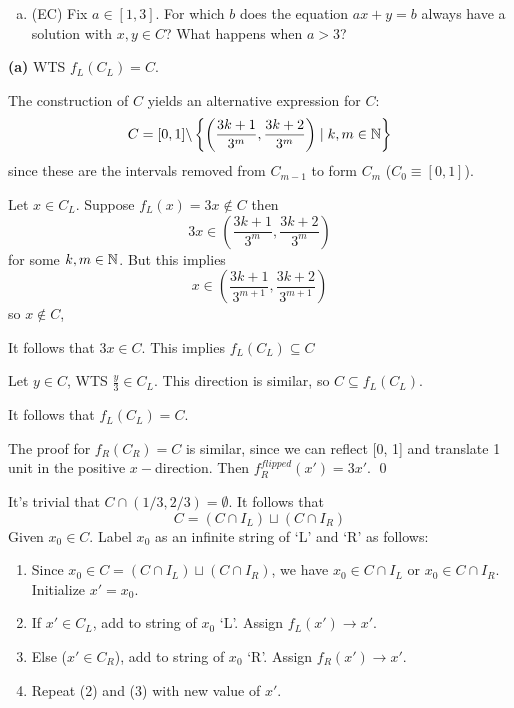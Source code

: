 \documentclass[a4paper, 12pt]{article}
\begin{document}
\begin{problem} [IV]
\begin{enumerate} [(a)]
\begin{center}
          \end{center}
    \item (EC) Fix $a \in [1, 3]$. For which $b$ does the equation $ax + y = b$ always have a solution with $x, y \in C$? What happens when $a > 3$?
\end{enumerate}
\end{problem}
\begin{solution}
    \textbf{(a)} WTS $f_L(C_L) = C$.

    The construction of $C$ yields an alternative expression for $C$:
    \[
        C = [0, 1]\backslash\left\{\left(\frac{3k+1}{3^m}, \frac{3k+2}{3^m}\right) \mid k, m \in \mathbb{N}\right\}
    \]
    since these are the intervals removed from $C_{m-1}$ to form $C_m$ ($C_0 \equiv [0, 1]$).

    Let $x \in C_L$. Suppose $f_L(x) = 3x \not \in C$ then \[
        3x \in \left( \frac{3k+1}{3^m}, \frac{3k+2}{3^m} \right)
    \]
    for some $k, m \in \mathbb{N}$. But this implies \[
        x \in \left( \frac{3k+1}{3^{m+1}}, \frac{3k+2}{3^{m+1}} \right)
    \]
    so $x \not \in C$, \contra

    It follows that $3x \in C$. This implies $f_L(C_L) \subseteq  C$

    Let $y \in C$, WTS $\frac{y}{3} \in C_L$. This direction is similar, so $C \subseteq f_L(C_L)$.

    It follows that $f_L(C_L) = C$.

    The proof for $f_R(C_R) = C$ is similar, since we can reflect [0, 1] and translate 1 unit in the positive $x-$direction. Then $f^{flipped}_R(x') = 3x'$. \qed


    It's trivial that $C \cap (1/3, 2/3) = \emptyset$. It follows that \[
        C  = (C \cap I_L) \sqcup (C \cap I_R)
    \]
    Given $x_0 \in C$. Label $x_0$ as an infinite string of `L' and `R' as follows:


    \begin{enumerate}
        \item Since $x_0 \in C = (C \cap I_L) \sqcup (C \cap I_R)$, we have $x_0 \in C \cap I_L$ or $x_0 \in C \cap I_R$. Initialize $x' = x_0$.
        \item If $x' \in C_L$, add to string of $x_0$ `L'. Assign $f_L(x') \to x'$.
        \item Else ($x' \in C_R$), add to string of $x_0$ `R'. Assign $f_R(x') \to x'$.
        \item Repeat (2) and (3) with new value of $x'$.
    \end{enumerate}


\end{solution}
\end{document}
